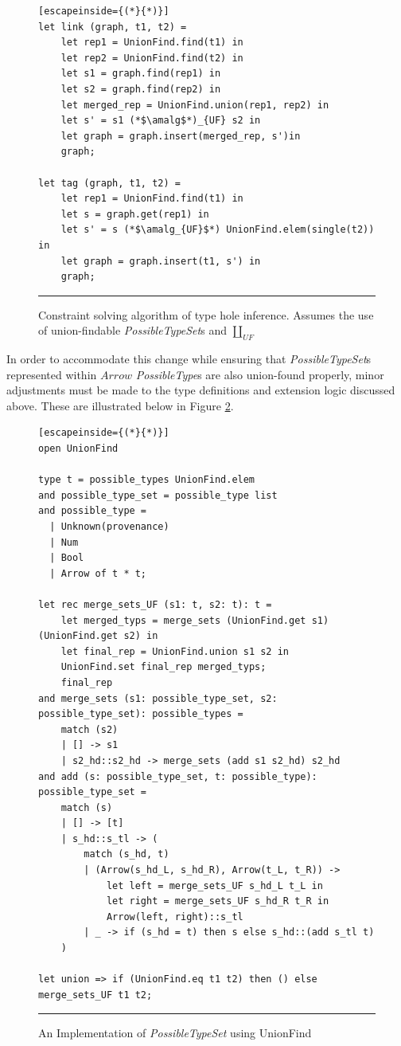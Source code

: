 \begin{figure}[htbp]
\begin{lstlisting}[escapeinside={(*}{*)}]
let link (graph, t1, t2) =
    let rep1 = UnionFind.find(t1) in
    let rep2 = UnionFind.find(t2) in
    let s1 = graph.find(rep1) in
    let s2 = graph.find(rep2) in 
    let merged_rep = UnionFind.union(rep1, rep2) in
    let s' = s1 (*$\amalg$*)_{UF} s2 in
    let graph = graph.insert(merged_rep, s')in
    graph;

let tag (graph, t1, t2) =
    let rep1 = UnionFind.find(t1) in
    let s = graph.get(rep1) in
    let s' = s (*$\amalg_{UF}$*) UnionFind.elem(single(t2)) in
    let graph = graph.insert(t1, s') in 
    graph;
\end{lstlisting}
\vspace{-4px}
 \hrule
\caption{Constraint solving algorithm of type hole inference. Assumes the use of union-findable \textit{PossibleTypeSet}s and $\amalg_{UF}$}
\label{fig:linkandTagUF}
\end{figure}

In order to accommodate this change while ensuring that \textit{PossibleTypeSet}s represented within $Arrow$ \textit{PossibleType}s are also union-found properly, minor adjustments must be made to the type definitions and extension logic discussed above. These are illustrated below in Figure \ref{fig:ufalgcode}.

\begin{figure}[htbp]
\begin{lstlisting}[escapeinside={(*}{*)}]
open UnionFind

type t = possible_types UnionFind.elem
and possible_type_set = possible_type list
and possible_type =
  | Unknown(provenance)
  | Num
  | Bool
  | Arrow of t * t;

let rec merge_sets_UF (s1: t, s2: t): t =
    let merged_typs = merge_sets (UnionFind.get s1) (UnionFind.get s2) in
    let final_rep = UnionFind.union s1 s2 in
    UnionFind.set final_rep merged_typs;
    final_rep
and merge_sets (s1: possible_type_set, s2: possible_type_set): possible_types = 
    match (s2)
    | [] -> s1
    | s2_hd::s2_hd -> merge_sets (add s1 s2_hd) s2_hd
and add (s: possible_type_set, t: possible_type): possible_type_set =
    match (s)
    | [] -> [t]
    | s_hd::s_tl -> (
        match (s_hd, t)
        | (Arrow(s_hd_L, s_hd_R), Arrow(t_L, t_R)) ->
            let left = merge_sets_UF s_hd_L t_L in
            let right = merge_sets_UF s_hd_R t_R in
            Arrow(left, right)::s_tl
        | _ -> if (s_hd = t) then s else s_hd::(add s_tl t)
    )

let union => if (UnionFind.eq t1 t2) then () else merge_sets_UF t1 t2;
\end{lstlisting}
\vspace{-4px}
 \hrule
\caption{An Implementation of \textit{PossibleTypeSet} using UnionFind}
\label{fig:ufalgcode}
\end{figure}

